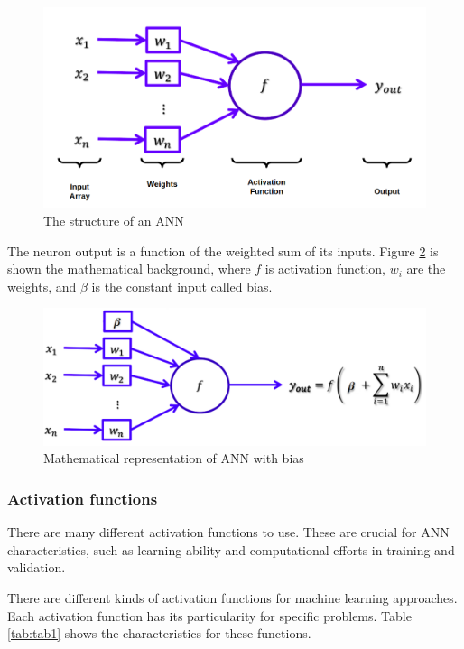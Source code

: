 \begin{figure}[H]
\centering
\includegraphics[width=\columnwidth]{imagens/ann.png}
\caption{The structure of an ANN \cite{lecture}}
\label{fig:ann}
\end{figure}

The neuron output is a function of the weighted sum of its inputs. Figure \ref{fig:ann_weight} is shown the mathematical background, where $f$ is activation function, $w_i$ are the weights, and $\beta$ is the constant input called bias.


\begin{figure}[H]
\centering
\includegraphics[width=\columnwidth]{imagens/math_ann_bias.png}
\caption{Mathematical representation of ANN with bias \cite{lecture}}
\label{fig:ann_weight}
\end{figure}


\subsubsection{Activation functions}
There are many different activation functions to use. These are crucial for ANN characteristics, such as learning ability and computational efforts in training and validation.

There are different kinds of activation functions for machine learning approaches. Each activation function has its particularity for specific problems. Table \ref{tab:tab1} shows the characteristics for these functions. 



